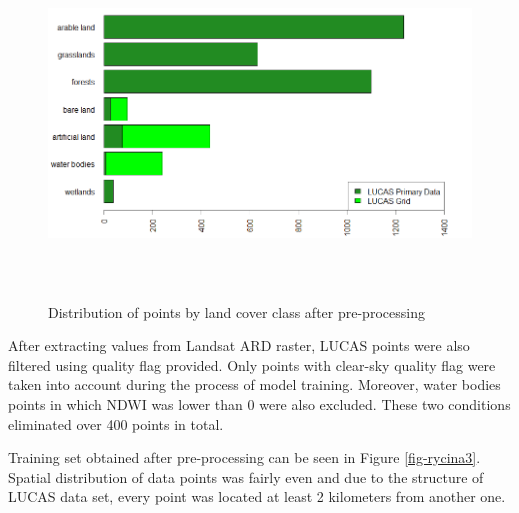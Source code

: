 \documentclass{amuthesis}
\begin{document}
\begin{figure}[t]

{\centering \includegraphics[width=1\textwidth,height=3.64583in]{./figures/lucas_data.png}

}

\caption{\label{fig-rycina2}Distribution of points by land cover class
after pre-processing}

\end{figure}

After extracting values from Landsat ARD raster, LUCAS points were also
filtered using quality flag provided. Only points with clear-sky quality
flag were taken into account during the process of model training.
Moreover, water bodies points in which NDWI was lower than 0 were also
excluded. These two conditions eliminated over 400 points in total.

Training set obtained after pre-processing can be seen in Figure
\ref{fig-rycina3}. Spatial distribution of data points was fairly even
and due to the structure of LUCAS data set, every point was located at
least 2 kilometers from another one.
\end{document}
